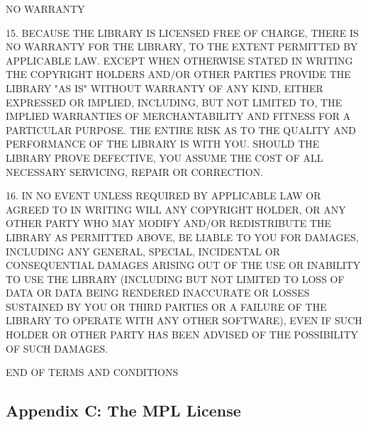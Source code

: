 \begin{DoxyCode}
NO WARRANTY

  15. BECAUSE THE LIBRARY IS LICENSED FREE OF CHARGE, THERE IS NO
WARRANTY FOR THE LIBRARY, TO THE EXTENT PERMITTED BY APPLICABLE LAW.
EXCEPT WHEN OTHERWISE STATED IN WRITING THE COPYRIGHT HOLDERS AND/OR
OTHER PARTIES PROVIDE THE LIBRARY "AS IS" WITHOUT WARRANTY OF ANY
KIND, EITHER EXPRESSED OR IMPLIED, INCLUDING, BUT NOT LIMITED TO, THE
IMPLIED WARRANTIES OF MERCHANTABILITY AND FITNESS FOR A PARTICULAR
PURPOSE.  THE ENTIRE RISK AS TO THE QUALITY AND PERFORMANCE OF THE
LIBRARY IS WITH YOU.  SHOULD THE LIBRARY PROVE DEFECTIVE, YOU ASSUME
THE COST OF ALL NECESSARY SERVICING, REPAIR OR CORRECTION.

  16. IN NO EVENT UNLESS REQUIRED BY APPLICABLE LAW OR AGREED TO IN
WRITING WILL ANY COPYRIGHT HOLDER, OR ANY OTHER PARTY WHO MAY MODIFY
AND/OR REDISTRIBUTE THE LIBRARY AS PERMITTED ABOVE, BE LIABLE TO YOU
FOR DAMAGES, INCLUDING ANY GENERAL, SPECIAL, INCIDENTAL OR
CONSEQUENTIAL DAMAGES ARISING OUT OF THE USE OR INABILITY TO USE THE
LIBRARY (INCLUDING BUT NOT LIMITED TO LOSS OF DATA OR DATA BEING
RENDERED INACCURATE OR LOSSES SUSTAINED BY YOU OR THIRD PARTIES OR A
FAILURE OF THE LIBRARY TO OPERATE WITH ANY OTHER SOFTWARE), EVEN IF
SUCH HOLDER OR OTHER PARTY HAS BEEN ADVISED OF THE POSSIBILITY OF SUCH
DAMAGES.

END OF TERMS AND CONDITIONS
\end{DoxyCode}


\subsection*{Appendix C\+: The M\+PL License }


